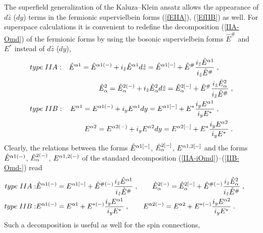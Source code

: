 \documentclass[a4paper,11pt]{article}
\begin{document}
The superfield generalization of the Kaluza--Klein ansatz 
\cite{ansatz} allows the appearance of $d\hat{z}$ ($dy$) terms in the 
fermionic supervielbein forms (\ref{fEIIA}), (\ref{EfIIB}) as well.  
For superspace calculations it is convenient to redefine  the 
decomposition (\ref{IIA-Omd}) of the fermionic forms  by using 
the bosonic supervielbein forms $\hat{E}^{ {\#}}$ and ${E}^{ {*}}$ 
instead of $d\hat{z}$ ($dy$),  
 \begin{eqnarray}\label{EfIIA}
& type\;  IIA : &      \hat{E}^{{\alpha}1}=
      \hat{E}^{{\alpha}1(-)} + 
i_{\hat{z}}\hat{E}^{{\alpha}1} d\hat{z}  = 
\hat{E}^{{\alpha}1[-]} + \hat{E}^{\#} {i_{\hat{z}}\hat{E}^{{\alpha}1}\over 
i_{\hat{z}}\hat{E}^{\#}} \; , 
\qquad   \nonumber \\ && 
\hat{E}_{\alpha}^2=
      \hat{E}_{\alpha}^{2(-)} + i_{\hat{z}}\hat{E}_{\alpha}^2 d\hat{z} = 
\hat{E}_{\alpha}^{2[-]} + \hat{E}^{\#} {i_{\hat{z}}\hat{E}_{\alpha}^2\over 
i_{\hat{z}}\hat{E}^{\#}} \; ,
\\ \label{EfIIB}
& type \; IIB : &     
{E}^{ {{\alpha}}1}= {E}^{ {{\alpha}}1(-)} + i_y {E}^{ {{\alpha}}1}dy=
 {E}^{ {{\alpha}}1[-]} + E^* {i_y {E}^{ {{\alpha}}1}\over i_y E^*} 
      \; , \qquad   \nonumber \\ &&
     {E}^{ {{\alpha}}2}= {E}^{ {{\alpha}}2(-)} + i_y {E}^{ {{\alpha}}2} dy=
 {E}^{ {{\alpha}}2[-]} + E^* {i_y {E}^{ {{\alpha}}2}\over i_y E^*} \; .        
\end{eqnarray}
Clearly, the relations between the forms 
$\hat{E}^{{\alpha}1[-]}$, $\hat{E}_{\alpha}^{2[-]}$, 
${E}^{ {{\alpha}}1,2[-]}$ and the forms 
$\hat{E}^{{\alpha}1(-)}$, $\hat{E}_{\alpha}^{2(-)}$, 
${E}^{ {{\alpha}}1,2(-)}$ of the standard decomposition 
(\ref{IIA-iOmd})--(\ref{IIB-Omd-}) read 
 \begin{eqnarray}\label{EfIIA-}
type\;  IIA : &      
\hat{E}^{ {{\alpha}1}(-)}= 
{E}^{{\alpha}1[-]} +
     \hat{E}^{\#(-)} {i_{\hat{z}}\hat{E}^{{\alpha}1}\over 
i_{\hat{z}}\hat{E}^{\#}} \; , 
\qquad 
\hat{E}^{2(-)}_{ {{\alpha}}} = \hat{E}^{2[-]}_{ {{\alpha}}} +             
     \hat{E}^{ {\#}(-)} {i_{\hat{z}}\hat{E}_{\alpha}^2\over 
i_{\hat{z}}\hat{E}^{\#}}\; , \qquad 
\\ \label{EfIIB-}
 type \; IIB : &  
{E}^{{\alpha}1(-)}=
                  E^{ {{\alpha}}1} +
     {E}^{ {*} (-)} {i_y {E}^{ {{\alpha}}1}\over i_y E^*}  \; , 
\qquad 
{E}^{{\alpha}2(-)}=
                  E^{ {{\alpha}}2} +
     {E}^{ {*} (-)} {i_y {E}^{ {{\alpha}}2}\over i_y E^*}  \; . 
\end{eqnarray}
Such a decomposition is useful as well for the spin connections, 
\end{document}
